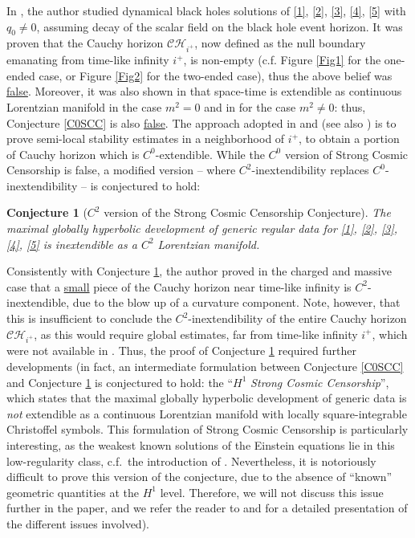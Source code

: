 \documentclass[10pt,a4paper]{article}
\theoremstyle{plain}
\newtheorem{conjecture}[thm]{Conjecture}
\theoremstyle{remark}
\theoremstyle{definition}
\theoremstyle{plain}
\theoremstyle{remark}
\theoremstyle{definition}
\newcommand{\CH}{\mathcal{CH}_{i^+}}
\numberwithin{equation}{section}
\begin{document}
 	
 	In \cite{Moi}, the author studied dynamical black holes solutions of \eqref{1},  \eqref{2}, \eqref{3}, \eqref{4}, \eqref{5} with $q_0 \neq 0$, assuming decay of the scalar field on the black hole event horizon. It was proven that the Cauchy horizon $\CH$, now defined as the null boundary emanating from time-like infinity $i^+$, is non-empty (c.f. Figure \ref{Fig1} for the one-ended case, or Figure \ref{Fig2} for the two-ended case), thus the above belief was \underline{false}. Moreover, it was also shown in \cite{Moi} that space-time is extendible as continuous Lorentzian manifold  in the case $m^2=0$ and in \cite{Moi3Christoph} for the case $m^2 \neq 0$: thus, Conjecture \ref{C0SCC} is also \underline{false}. The approach adopted in \cite{Moi} and \cite{Moi3Christoph} (see also \cite{MoiThesis}) is to prove semi-local stability estimates in a neighborhood of $i^+$, to obtain a portion of Cauchy horizon which is $C^0$-extendible. While the $C^0$ version of Strong Cosmic Censorship is false, a modified version -- where $C^2$-inextendibility replaces $C^0$-inextendibility -- is conjectured to hold: \begin{conjecture}[$C^2$ version of the Strong Cosmic Censorship Conjecture] \label{C2SCC} The maximal globally hyperbolic development of generic regular data for \eqref{1}, \eqref{2}, \eqref{3}, \eqref{4}, \eqref{5} is inextendible as a $C^2$ Lorentzian manifold.\end{conjecture} 
 	Consistently with Conjecture \ref{C2SCC}, the author proved \cite{Moi} in the charged and massive case that a \underline{small} piece of the Cauchy horizon near time-like infinity \color{black} is $C^2$-inextendible, due to the blow up of a curvature component. Note, however, that this is insufficient to conclude the $C^2$-inextendibility of the entire Cauchy horizon $\CH$, as this would require global estimates, far from time-like infinity $i^+$, which were not available in \cite{Moi}. Thus, the proof of Conjecture \ref{C2SCC} required further developments (in fact, an intermediate formulation between Conjecture \ref{C0SCC} and Conjecture \ref{C2SCC} is conjectured to hold: the ``$H^1$ \textit{Strong Cosmic Censorship}'', which states that the maximal globally hyperbolic development of generic data is \textit{not} extendible as a continuous Lorentzian manifold with locally square-integrable Christoffel symbols. This formulation of Strong Cosmic Censorship is particularly interesting, as the weakest known solutions of the Einstein equations lie in this low-regularity class, c.f.\ the introduction of \cite{Christo5}. Nevertheless, it is notoriously difficult to prove this version of the conjecture, due to the absence of ``known'' geometric quantities at the $H^1$ level. Therefore, we will not discuss this issue further in the paper, and we refer the reader to \cite{KerrStab} and \cite{JonathanStab} for a detailed presentation of the different issues involved).
 	
\end{document}
